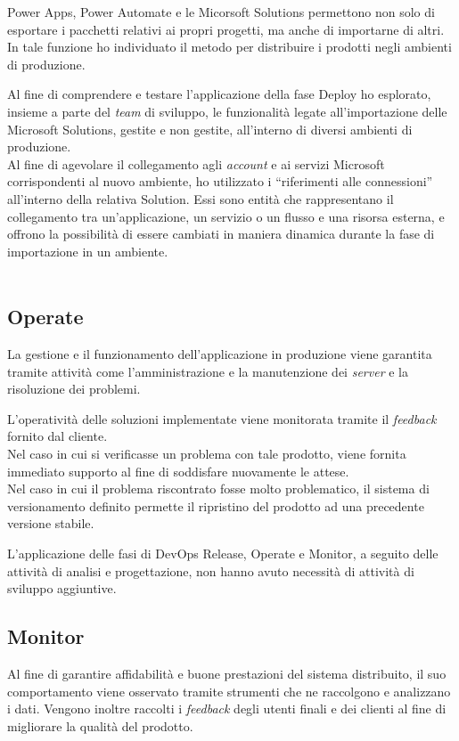 Power Apps, Power Automate e le Micorsoft Solutions permettono non solo di esportare i pacchetti relativi ai propri progetti, ma anche di importarne di altri.\\
In tale funzione ho individuato il metodo per distribuire i prodotti negli ambienti di produzione. 
    
Al fine di comprendere e testare l'applicazione della fase Deploy ho esplorato, insieme a parte del \emph{team} di sviluppo, le funzionalità legate all'importazione delle Microsoft Solutions, gestite e non gestite, all'interno di diversi ambienti di produzione.\\ 
Al fine di agevolare il collegamento agli \emph{account} e ai servizi Microsoft corrispondenti al nuovo ambiente, ho utilizzato i “riferimenti alle connessioni” all'interno della relativa Solution.
Essi sono entità che rappresentano il collegamento tra un'applicazione, un servizio o un flusso e una risorsa esterna, e offrono la possibilità di essere cambiati in maniera dinamica durante la fase di importazione in un ambiente.\\\\
    

\subsection{Operate}
La gestione e il funzionamento dell'applicazione in produzione viene garantita tramite attività come l'amministrazione e la manutenzione dei \emph{server} e la risoluzione dei problemi. 

L'operatività delle soluzioni implementate viene monitorata tramite il \emph{feedback} fornito dal cliente.\\
Nel caso in cui si verificasse un problema con tale prodotto, viene fornita immediato supporto al fine di soddisfare nuovamente le attese.\\
Nel caso in cui il problema riscontrato fosse molto problematico, il sistema di versionamento definito permette il ripristino del prodotto ad una precedente versione stabile. 

L'applicazione delle fasi di \gls{DevOps} Release, Operate e Monitor, a seguito delle attività di analisi e progettazione, non hanno avuto necessità di attività di sviluppo aggiuntive. 


\subsection{Monitor}
Al fine di garantire affidabilità e buone prestazioni del sistema distribuito, il suo comportamento viene osservato tramite strumenti che ne raccolgono e analizzano i dati. 
Vengono inoltre raccolti i \emph{feedback} degli utenti finali e dei clienti al fine di migliorare la qualità del prodotto. 

